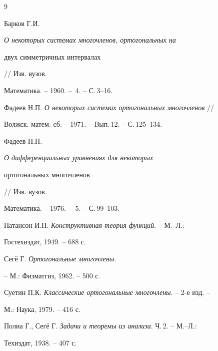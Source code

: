 \begin{thebibliography}{9} 


 




Барков Г.И. {\em О некоторых системах многочленов, ортогональных на 


двух симметричных интервалах} // Изв. вузов. 


Математика. -- 1960. -- \No\,4. -- С.\,3--16. 




Фадеев Н.П. {\em О некоторых системах ортогональных многочленов} // 


Волжск. матем. сб. -- 1971. -- Bып.\,12. -- С.\,125--134. 




Фадеев Н.П. {\em О дифференциальных уравнениях для некоторых 


ортогональных многочленов} // Изв. вузов. 


Математика. -- 1976. -- \No\,5. -- С.\,99--103. 




Натансон И.П. {\em Конструктивная теория функций}. -- М.--Л.: 


Гостехиздат, 1949. -- 688 с. 




Сег\"е Г. {\em Ортогональные многочлены}. 


-- М.: Физматгиз, 1962. -- 500 с. 




Суетин П.К. {\em Классические ортогональные многочлены}. -- 2-е изд. -- 


М.: Наука, 1979. -- 416 с. 




Полиа Г., Сег\"е Г. {\em Задачи и теоремы из анализа}. Ч.\,2. -- М.--Л.: 


Техиздат, 1938. -- 407 с. 


 


\end{thebibliography} 


 


\vskip 2cm 


 








 


\label{end} 


 


 


